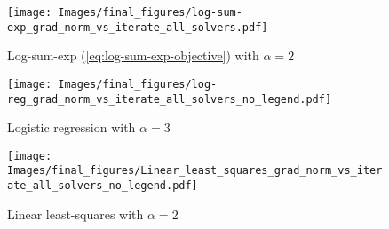 \documentclass{article}
\begin{document}
\begin{figure*}
    \centering
    \begin{subfigure}[t]{0.34\textwidth}
        \centering
        \texttt{[image: Images/final\_figures/log-sum-exp\_grad\_norm\_vs\_iterate\_all\_solvers.pdf]}
        \caption{Log-sum-exp (\ref{eq:log-sum-exp-objective}) with $\alpha = 2$}
        \label{fig:log-sum-exp}
    \end{subfigure}
    \begin{subfigure}[t]{0.315\textwidth} %
        \centering
        \texttt{[image: Images/final\_figures/log-reg\_grad\_norm\_vs\_iterate\_all\_solvers\_no\_legend.pdf]}
        \caption{Logistic regression with $\alpha = 3$}
        \label{fig:log-reg}
    \end{subfigure}
    \begin{subfigure}[t]{0.315\textwidth} %
        \centering
        \texttt{[image: Images/final\_figures/Linear\_least\_squares\_grad\_norm\_vs\_iterate\_all\_solvers\_no\_legend.pdf]}
        \caption{Linear least-squares with $\alpha = 2$}
        \label{fig:linear-least-squares}
    \end{subfigure}
    \caption{Gradient Euclidean norm of solution at $t$ iterate. Learning rates were chosen to minimize loss of the algorithm in original coordinates. We induce EGOP spectral decay by choice of data matrix $A$ with singular values $\sigma_k(A) = k^{-\alpha}$. As noted in the prose, in some plots the dotted traces coincide with the solid and are thus not visible (Adagrad in \cref{fig:log-sum-exp}, Adam in  \cref{fig:log-sum-exp}).}
    \label{fig:cvx-objectives}
\end{figure*}
\end{document}
